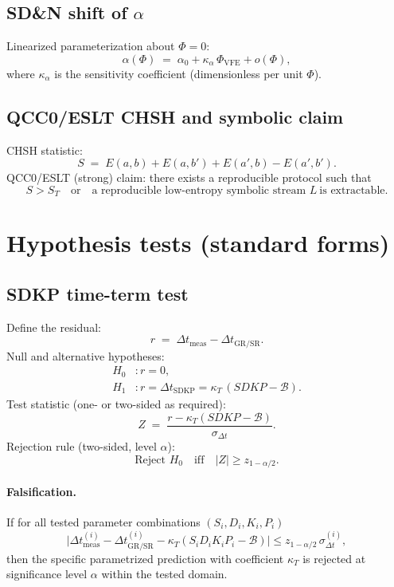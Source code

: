 \documentclass{article}
\begin{document}
\subsection{SD\&N shift of $\alpha$}
Linearized parameterization about $\Phi=0$:
\[
\alpha(\Phi) \;=\; \alpha_0 + \kappa_\alpha\,\Phi_{\mathrm{VFE}} + o(\Phi),
\]
where $\kappa_\alpha$ is the sensitivity coefficient (dimensionless per unit $\Phi$).

\subsection{QCC0/ESLT CHSH and symbolic claim}
CHSH statistic:
\[
S \;=\; E(a,b)+E(a,b')+E(a',b)-E(a',b').
\]
QCC0/ESLT (strong) claim: there exists a reproducible protocol such that
\[
S > S_T \quad\text{or}\quad \text{a reproducible low-entropy symbolic stream }L\ \text{is extractable.}
\]

\section{Hypothesis tests (standard forms)}

\subsection{SDKP time-term test}
Define the residual:
\[
r \;=\; \Delta t_{\mathrm{meas}} - \Delta t_{\mathrm{GR/SR}}.
\]
Null and alternative hypotheses:
\[
\begin{aligned}
H_0 &: r = 0,\\
H_1 &: r = \Delta t_{\mathrm{SDKP}} = \kappa_T\,(S D K P - \mathcal{B}).
\end{aligned}
\]
Test statistic (one- or two-sided as required):
\[
Z \;=\; \frac{r - \kappa_T (S D K P - \mathcal{B})}{\sigma_{\Delta t}}.
\]
Rejection rule (two-sided, level $\alpha$):
\[
\text{Reject } H_0 \quad\text{iff}\quad |Z| \ge z_{1-\alpha/2}.
\]

\paragraph{Falsification.}
If for all tested parameter combinations $(S_i,D_i,K_i,P_i)$
\[
\big| \Delta t_{\mathrm{meas}}^{(i)} - \Delta t_{\mathrm{GR/SR}}^{(i)} - \kappa_T (S_iD_iK_iP_i - \mathcal{B}) \big|
\le z_{1-\alpha/2}\,\sigma_{\Delta t}^{(i)},
\]
then the specific parametrized prediction with coefficient $\kappa_T$ is rejected at significance level $\alpha$ within the tested domain.
\end{document}
